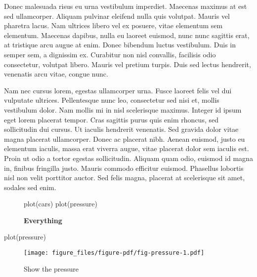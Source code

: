 \documentclass[
]{article}
\newenvironment{Shaded}{}{}
\newcommand{\FunctionTok}[1]{\textcolor[rgb]{0.02,0.16,0.49}{#1}}
\newcommand{\NormalTok}[1]{#1}
\begin{document}
Donec malesuada risus eu urna vestibulum imperdiet. Maecenas maximus at
est sed ullamcorper. Aliquam pulvinar eleifend nulla quis volutpat.
Mauris vel pharetra lacus. Nam ultrices libero vel ex posuere, vitae
elementum sem elementum. Maecenas dapibus, nulla eu laoreet euismod,
nunc nunc sagittis erat, at tristique arcu augue at enim. Donec bibendum
luctus vestibulum. Duis in semper sem, a dignissim ex. Curabitur non
nisl convallis, facilisis odio consectetur, volutpat libero. Mauris vel
pretium turpis. Duis sed lectus hendrerit, venenatis arcu vitae, congue
nunc.

Nam nec cursus lorem, egestas ullamcorper urna. Fusce laoreet felis vel
dui vulputate ultrices. Pellentesque nunc leo, consectetur sed nisi et,
mollis vestibulum dolor. Nam mollis mi in nisl scelerisque maximus.
Integer id ipsum eget lorem placerat tempor. Cras sagittis purus quis
enim rhoncus, sed sollicitudin dui cursus. Ut iaculis hendrerit
venenatis. Sed gravida dolor vitae magna placerat ullamcorper. Donec ac
placerat nibh. Aenean euismod, justo eu elementum iaculis, massa erat
viverra augue, vitae placerat dolor sem iaculis est. Proin ut odio a
tortor egestas sollicitudin. Aliquam quam odio, euismod id magna in,
finibus fringilla justo. Mauris commodo efficitur euismod. Phasellus
lobortis nisl non velit porttitor auctor. Sed felis magna, placerat at
scelerisque sit amet, sodales sed enim.

\begin{figure}
\centering

\begin{Shaded}
\begin{Highlighting}[]
\FunctionTok{plot}\NormalTok{(cars)}
\FunctionTok{plot}\NormalTok{(pressure)}
\end{Highlighting}
\end{Shaded}



\caption{\textbf{Everything}}

\label{fig:parent}

\end{figure}

\begin{Shaded}
\begin{Highlighting}[]
\FunctionTok{plot}\NormalTok{(pressure)}
\end{Highlighting}
\end{Shaded}

\begin{figure}
\hypertarget{fig:pressure}{%
\centering
\texttt{[image: figure\_files/figure-pdf/fig-pressure-1.pdf]}
\caption{Show the pressure}\label{fig:pressure}
}
\end{figure}
\end{document}
